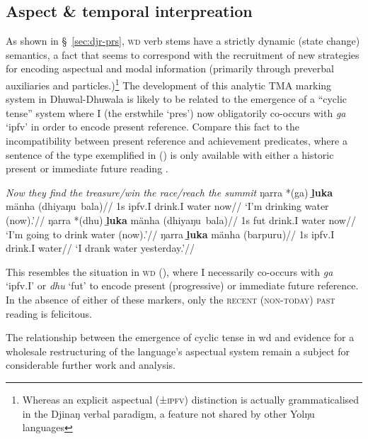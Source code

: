 \subsection{Aspect \& temporal interpreation}
As shown in \S~\ref{sec:djr-prs}, \textsc{wd} verb stems have a strictly dynamic (state change) semantics, a fact that seems to correspond with the recruitment of new strategies for encoding aspectual and modal information (primarily through preverbal auxiliaries and particles.)\footnote{Whereas an explicit aspectual (±\textsc{ipfv}) distinction is actually grammaticalised in the Djinaŋ verbal paradigm, a feature not shared by other Yolŋu languages} The development of this analytic TMA marking system in Dhuwal-Dhuwala is likely to be related to the emergence of a ``cyclic tense'' system where \gls{I} (the erstwhile `\gls{pres}') now obligatorily co-occurs with \textit{ga} `\gls{ipfv}' in order to encode present reference. Compare this fact to the incompatibility between present reference and achievement predicates, where a sentence of the type exemplified in (\nextx) is only available with either a historic present or immediate future reading \citep[an observation following][147]{Vendler1957}.


\pex\textit{Now they find the treasure/win the race/reach the summit}\xe
\pex\a\begingl\gla ŋarra *(ga) \textbf{ḻuka} mänha (dhiyaŋu~bala)//
\glb 1s \gls{ipfv}.\gls{I} drink.\gls{I} water now//
\glft`I'm drinking water (now).'\trailingcitation{[DB~20190405]}//\endgl
\a\begingl\gla ŋarra *(dhu) \textbf{ḻuka} mänha (dhiyaŋu~bala)//
\glb 1s \gls{fut} drink.\gls{I} water now//
\glft`I'm going to drink water (now).'\trailingcitation{[DB~20190405]}//\endgl
\a\begingl\gla ŋarra \textbf{ḻuka} mänha (barpuru)//
\glb 1s \gls{ipfv}.\gls{I} drink.\gls{I} water//
\glft`I drank water yesterday.'\trailingcitation{[DB~20190405]}//\endgl

\xe

This resembles the situation in \textsc{wd} (), where \gls{I} necessarily co-occurs with \textit{ga} `\gls{ipfv}.\gls{I}' or \textit{dhu} `\gls{fut}' to encode present (progressive) or immediate future reference. In the absence of either of these markers, only the \textsc{recent (non-today) past} reading is felicitous.

The relationship between the emergence of cyclic tense in \gls{wd} and evidence for a wholesale restructuring of the language's aspectual system remain a subject for considerable further work and analysis.

